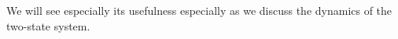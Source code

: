 We will see especially its usefulness especially as we discuss the dynamics of the two-state system.